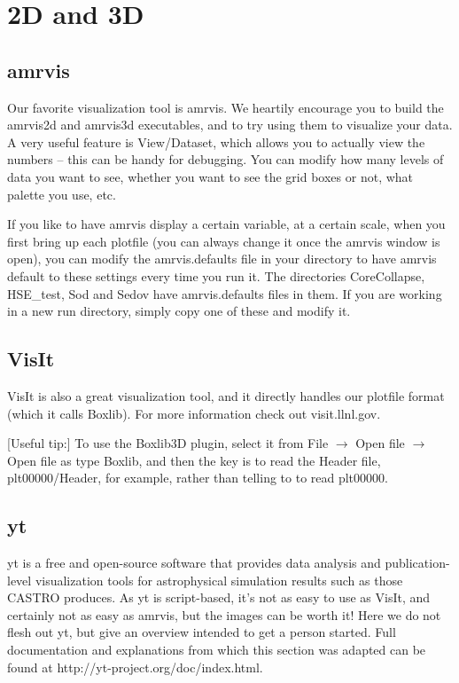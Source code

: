 \section{2D and 3D}
\subsection{amrvis}
Our favorite visualization tool is amrvis. We heartily encourage you to build the amrvis2d and amrvis3d executables, and to try using them to visualize your data. A very useful feature is View/Dataset, which allows you to actually view the numbers -- this can be handy for debugging. You can modify how many levels of data you want to see, whether you want to see the grid boxes or not, what palette you use, etc.

If you like to have amrvis display a certain variable, at a certain scale, when you first bring up each plotfile (you can always change it once the amrvis window is open), you can modify the amrvis.defaults file in your directory to have amrvis default to these settings every time you run it. The directories CoreCollapse, HSE\_test, Sod and Sedov have amrvis.defaults files in them. If you are working in a new run directory, simply copy one of these and modify it.
\subsection{VisIt}
VisIt is also a great visualization tool, and it directly handles our plotfile format (which it calls Boxlib).  For more information check out visit.llnl.gov.

[Useful tip:] To use the Boxlib3D plugin, select it from File $\rightarrow$ Open file $\rightarrow$ Open file as type Boxlib, and then the key is to read the Header file, plt00000/Header, for example, rather than telling to to read plt00000.

\subsection{yt}
yt is a free and open-source software that provides data analysis and publication-level visualization tools for astrophysical simulation results such as those CASTRO produces. As yt is script-based, it's not as easy to use as VisIt, and certainly not as easy as amrvis, but the images can be worth it! Here we do not flesh out yt, but give an overview intended to get a person started. Full documentation and explanations from which this section was adapted can be found at http://yt-project.org/doc/index.html.

